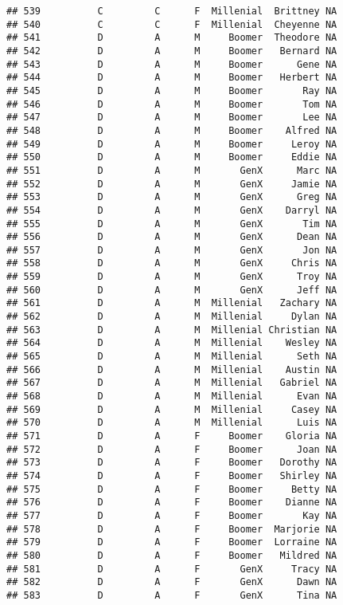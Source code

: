 \documentclass[
]{article}
\begin{document}
\begin{verbatim}
## 539          C         C      F  Millenial  Brittney NA
## 540          C         C      F  Millenial  Cheyenne NA
## 541          D         A      M     Boomer  Theodore NA
## 542          D         A      M     Boomer   Bernard NA
## 543          D         A      M     Boomer      Gene NA
## 544          D         A      M     Boomer   Herbert NA
## 545          D         A      M     Boomer       Ray NA
## 546          D         A      M     Boomer       Tom NA
## 547          D         A      M     Boomer       Lee NA
## 548          D         A      M     Boomer    Alfred NA
## 549          D         A      M     Boomer     Leroy NA
## 550          D         A      M     Boomer     Eddie NA
## 551          D         A      M       GenX      Marc NA
## 552          D         A      M       GenX     Jamie NA
## 553          D         A      M       GenX      Greg NA
## 554          D         A      M       GenX    Darryl NA
## 555          D         A      M       GenX       Tim NA
## 556          D         A      M       GenX      Dean NA
## 557          D         A      M       GenX       Jon NA
## 558          D         A      M       GenX     Chris NA
## 559          D         A      M       GenX      Troy NA
## 560          D         A      M       GenX      Jeff NA
## 561          D         A      M  Millenial   Zachary NA
## 562          D         A      M  Millenial     Dylan NA
## 563          D         A      M  Millenial Christian NA
## 564          D         A      M  Millenial    Wesley NA
## 565          D         A      M  Millenial      Seth NA
## 566          D         A      M  Millenial    Austin NA
## 567          D         A      M  Millenial   Gabriel NA
## 568          D         A      M  Millenial      Evan NA
## 569          D         A      M  Millenial     Casey NA
## 570          D         A      M  Millenial      Luis NA
## 571          D         A      F     Boomer    Gloria NA
## 572          D         A      F     Boomer      Joan NA
## 573          D         A      F     Boomer   Dorothy NA
## 574          D         A      F     Boomer   Shirley NA
## 575          D         A      F     Boomer     Betty NA
## 576          D         A      F     Boomer    Dianne NA
## 577          D         A      F     Boomer       Kay NA
## 578          D         A      F     Boomer  Marjorie NA
## 579          D         A      F     Boomer  Lorraine NA
## 580          D         A      F     Boomer   Mildred NA
## 581          D         A      F       GenX     Tracy NA
## 582          D         A      F       GenX      Dawn NA
## 583          D         A      F       GenX      Tina NA

\end{verbatim}
\end{document}
